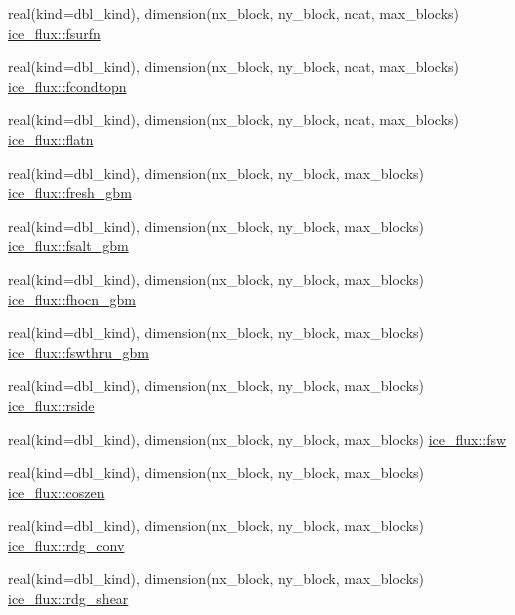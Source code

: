 \begin{DoxyCompactItemize}
\item 
real(kind=dbl\_\-kind), dimension(nx\_\-block, ny\_\-block, ncat, max\_\-blocks) \hyperlink{namespaceice__flux_aa05e0fe10c9628c94efe017d79f0cd1e}{ice\_\-flux::fsurfn}
\item 
real(kind=dbl\_\-kind), dimension(nx\_\-block, ny\_\-block, ncat, max\_\-blocks) \hyperlink{namespaceice__flux_a0f22ed9bcb531d5ea26305f27ed19d05}{ice\_\-flux::fcondtopn}
\item 
real(kind=dbl\_\-kind), dimension(nx\_\-block, ny\_\-block, ncat, max\_\-blocks) \hyperlink{namespaceice__flux_a43363f554cd27a966c89394ce573135e}{ice\_\-flux::flatn}
\item 
real(kind=dbl\_\-kind), dimension(nx\_\-block, ny\_\-block, max\_\-blocks) \hyperlink{namespaceice__flux_a962d1e42294e09b10fb22bc3554aa71b}{ice\_\-flux::fresh\_\-gbm}
\item 
real(kind=dbl\_\-kind), dimension(nx\_\-block, ny\_\-block, max\_\-blocks) \hyperlink{namespaceice__flux_ac48af307927403704bd7ad20cb0d54b3}{ice\_\-flux::fsalt\_\-gbm}
\item 
real(kind=dbl\_\-kind), dimension(nx\_\-block, ny\_\-block, max\_\-blocks) \hyperlink{namespaceice__flux_a0262e88be5633673703d664fdb6e5123}{ice\_\-flux::fhocn\_\-gbm}
\item 
real(kind=dbl\_\-kind), dimension(nx\_\-block, ny\_\-block, max\_\-blocks) \hyperlink{namespaceice__flux_ac9af65dc6cf70d6aed3b1eafc170c7a4}{ice\_\-flux::fswthru\_\-gbm}
\item 
real(kind=dbl\_\-kind), dimension(nx\_\-block, ny\_\-block, max\_\-blocks) \hyperlink{namespaceice__flux_aaea76ee9c1cbdc7807e6de1b05378957}{ice\_\-flux::rside}
\item 
real(kind=dbl\_\-kind), dimension(nx\_\-block, ny\_\-block, max\_\-blocks) \hyperlink{namespaceice__flux_acc02310f399ca37f700f432975393813}{ice\_\-flux::fsw}
\item 
real(kind=dbl\_\-kind), dimension(nx\_\-block, ny\_\-block, max\_\-blocks) \hyperlink{namespaceice__flux_af909ebcaf2c2e92389a7dfce1e42f5c7}{ice\_\-flux::coszen}
\item 
real(kind=dbl\_\-kind), dimension(nx\_\-block, ny\_\-block, max\_\-blocks) \hyperlink{namespaceice__flux_aff0f1042e74134275ef6e30a2719c03f}{ice\_\-flux::rdg\_\-conv}
\item 
real(kind=dbl\_\-kind), dimension(nx\_\-block, ny\_\-block, max\_\-blocks) \hyperlink{namespaceice__flux_a4b3e399d9f8de85996ef9292690e425e}{ice\_\-flux::rdg\_\-shear}
\end{DoxyCompactItemize}
